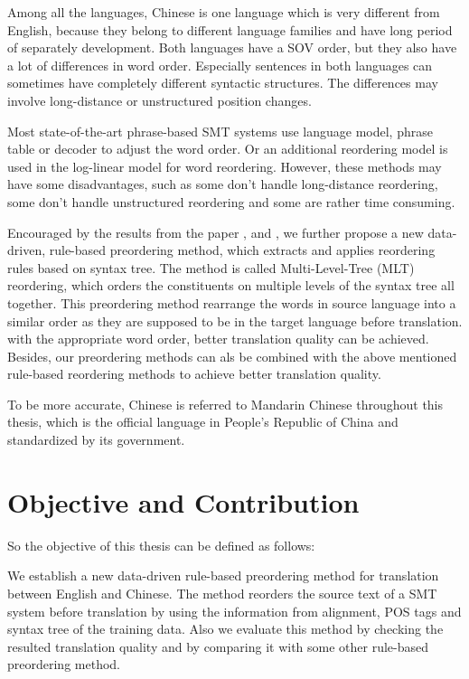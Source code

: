 Among all the languages, Chinese is one language which is very different from English, because they belong to different language families and have long period of separately development. Both languages have a SOV order, but they also have a lot of differences in word order. Especially sentences in both languages can sometimes have completely different syntactic structures. The differences may involve long-distance or unstructured position changes.

Most state-of-the-art phrase-based SMT systems use language model, phrase table or decoder to adjust the word order. Or an additional reordering model is used in the log-linear model for word reordering. However, these methods may have some disadvantages, such as some don't handle long-distance reordering, some don't handle unstructured reordering and some are rather time consuming.

Encouraged by the results from the paper \cite{short}, \cite{long} and \cite{tree}, we further propose a new data-driven, rule-based preordering method, which extracts and applies reordering rules based on syntax tree. The method is called Multi-Level-Tree (MLT) reordering, which orders the constituents on multiple levels of the syntax tree all together. This preordering method rearrange the words in source language into a similar order as they are supposed to be in the target language before translation. with the appropriate word order, better translation quality can be achieved. Besides, our preordering methods can als be combined with the above mentioned rule-based reordering methods to achieve better translation quality. 

To be more accurate, Chinese is referred to Mandarin Chinese throughout this thesis, which is the official language in People's Republic of China and standardized by its government.

\section{Objective and Contribution}
\label{ch:Introduction:sec:ObjectiveAndContribution}

So the objective of this thesis can be defined as follows:

\begin{center}
\parbox[c]{0.8\textwidth}{
We establish a new data-driven rule-based preordering method for translation between English and Chinese. The method reorders the source text of a SMT system before translation by using the information from alignment, POS tags and syntax tree of the training data. Also we evaluate this method by checking the resulted translation quality and by comparing it with some other rule-based preordering method.
}
\end{center}

